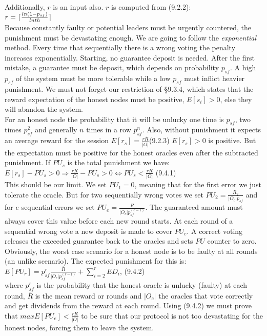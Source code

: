 \documentclass{article}
\DeclarePairedDelimiter{\ceil}{\lceil}{\rceil}
\begin{document}
{\paragraph{ }
Additionally, $r$ is an input also. $r$ is computed from (9.2.2):\\
$r=\ceil{\frac{ln{(1-p_{sf}})}{lnth}}$\\
Because constantly faulty or potential leaders must be urgently countered, the punishment must be devastating enough. We are going to follow the \emph{exponential} method. Every time that sequentially there is a wrong voting the penalty increases exponentially. Starting, no guarantee deposit is needed. After the first mistake, a guarantee must be deposit, which depends on probability ${p_{sf}}$. A high ${p_{sf}}$ of the system must be more tolerable while a low ${p_{sf}}$ must inflict heavier punishment. We must not forget our restriction of §9.3.4, which states that the reward expectation of the honest nodes must be positive, $E[s_i]>0$, else they will abandon the system. \\
For an honest node the probability that it will be unlucky one time is $p_{sf}$, two times $p_{sf}^2$ and generally $n$ times in a row $p_{sf}^n$. Also, without punishment it expects an average reward for the session $E[r_s]=\frac{r\overline{R}}{|O|}$(9.2.3) $E[r_s]>0$ is positive. But the expectation must be positive for the honest oracles even after the subtracted punishment. If $PU_s$ is the total punishment we have:\\
$E[r_s]-PU_s>0\Rightarrow \frac{r\overline{R}}{|O|}-PU_s>0\Leftrightarrow PU_s<\frac{r\overline{R}}{|O|}$ (9.4.1)\\
This should be our limit. We set $PU_1=0$, meaning that for the first error we just tolerate the oracle. But for two sequentially wrong votes we set $PU_2=\frac{R_2}{|O_c|p_{sf}}$ and for $e$ sequential errors we set $PU_e = \frac{R}{|O_c|p_{sf}^{(e-1)}}$. The guaranteed amount must always cover this value before each new round starts. At each round of a sequential wrong vote a new deposit is made to cover $PU_e$. A correct voting releases the exceeded guarantee back to the oracles and sets $PU$ counter to zero. Obviously, the worst case scenario for a honest node is to be faulty at all rounds (an unlike scenario). The expected punishment for this is:\\ 
$E[PU_r]=p_{sf}^r\frac{\overline{R}}{|O_c|p_{sf}^{(r-1)}}+\displaystyle\sum_{i=2}^r{ED}_i$, (9.4.2)\\
where  $p_{sf}^r$ is the probability that the honest oracle is unlucky (faulty) at each round, $\overline{R}$ is the mean reward or rounds and $|O_c|$ the oracles that vote correctly and get dividends from the reward at each round. Using (9.4.2) we must prove that $max{E[PU_e]}<\frac{r\overline{R}}{|O|}$ to be sure that our protocol is not too devastating for the honest nodes, forcing them to leave the system.\\
}
\end{document}
